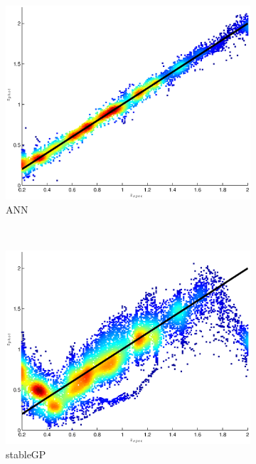 \documentclass[useAMS,usenatbib,fleqn]{mn2e}
\begin{document}
\begin{figure}
        \centering
        \begin{subfigure}[b]{0.175\textwidth}
                \includegraphics[width=\textwidth]{figures/ANN.eps}
                \caption{ANN}
        \end{subfigure}
        ~
        \begin{subfigure}[b]{0.175\textwidth}
                \includegraphics[width=\textwidth]{figures/stableGP.eps}
                \caption{stableGP}
        \end{subfigure}
        ~
        \begin{subfigure}[b]{0.175\textwidth}

\end{subfigure}
\end{figure}
\end{document}
